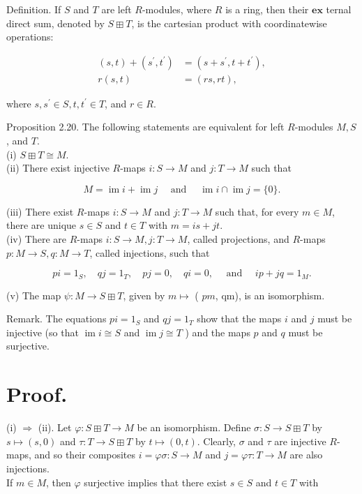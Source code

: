 \documentclass[10pt]{article}
\begin{document}
Definition. If $S$ and $T$ are left $R$-modules, where $R$ is a ring, then their $\boldsymbol{e x}$ ternal direct sum, denoted by $S \boxplus T$, is the cartesian product with coordinatewise operations:

$$
\begin{aligned}
(s, t)+\left(s^{\prime}, t^{\prime}\right) & =\left(s+s^{\prime}, t+t^{\prime}\right), \\
r(s, t) & =(r s, r t),
\end{aligned}
$$

where $s, s^{\prime} \in S, t, t^{\prime} \in T$, and $r \in R$.

Proposition 2.20. The following statements are equivalent for left $R$-modules $M, S$, and $T$.\\
(i) $S \boxplus T \cong M$.\\
(ii) There exist injective $R$-maps $i: S \rightarrow M$ and $j: T \rightarrow M$ such that

$$
M=\operatorname{im} i+\operatorname{im} j \quad \text { and } \quad \operatorname{im} i \cap \operatorname{im} j=\{0\} .
$$

(iii) There exist $R$-maps $i: S \rightarrow M$ and $j: T \rightarrow M$ such that, for every $m \in M$, there are unique $s \in S$ and $t \in T$ with $m=i s+j t$.\\
(iv) There are $R$-maps $i: S \rightarrow M, j: T \rightarrow M$, called projections, and $R$-maps $p: M \rightarrow S, q: M \rightarrow T$, called injections, such that

$$
p i=1_{S}, \quad q j=1_{T}, \quad p j=0, \quad q i=0, \quad \text { and } \quad i p+j q=1_{M} .
$$

(v) The map $\psi: M \rightarrow S \boxplus T$, given by $m \mapsto$ ( $p m$, qm), is an isomorphism.

Remark. The equations $p i=1_{S}$ and $q j=1_{T}$ show that the maps $i$ and $j$ must be injective (so that $\operatorname{im} i \cong S$ and $\operatorname{im} j \cong T$ ) and the maps $p$ and $q$ must be surjective.

\section*{Proof.}
(i) $\Rightarrow$ (ii). Let $\varphi: S \boxplus T \rightarrow M$ be an isomorphism. Define $\sigma: S \rightarrow S \boxplus T$ by $s \mapsto(s, 0)$ and $\tau: T \rightarrow S \boxplus T$ by $t \mapsto(0, t)$. Clearly, $\sigma$ and $\tau$ are injective $R$-maps, and so their composites $i=\varphi \sigma: S \rightarrow M$ and $j=\varphi \tau: T \rightarrow M$ are also injections.\\
If $m \in M$, then $\varphi$ surjective implies that there exist $s \in S$ and $t \in T$ with
\end{document}
